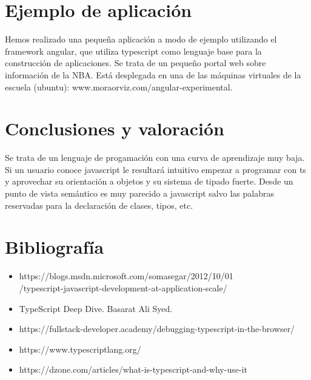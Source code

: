 \documentclass[12pt,twoside,a4paper, spanish]{article}
\begin{document}
    \section{Ejemplo de aplicación}
    
    Hemos realizado una pequeña aplicación a modo de ejemplo utilizando el framework angular, que utiliza typescript como lenguaje base para la construcción de aplicaciones. Se trata de un pequeño portal web sobre información de la NBA. Está desplegada en una de las máquinas virtuales de la escuela (ubuntu): www.moraorviz.com/angular-experimental.
    
    \section{Conclusiones y valoración}
    
    Se trata de un lenguaje de progamación con una curva de aprendizaje muy baja. Si un usuario conoce javascript le resultará intuitivo empezar a programar con ts y aprovechar su orientación a objetos y su sistema de tipado fuerte. Desde un punto de vista semántico es muy parecido a javascript salvo las palabras reservadas para la declaración de clases, tipos, etc. \\
    
    \section{Bibliografía}
    \begin{itemize}  
    	\item https://blogs.msdn.microsoft.com/somasegar/2012/10/01 \\ /typescript-javascript-development-at-application-scale/
    	\item TypeScript Deep Dive. Basarat Ali Syed. 
    	\item https://fullstack-developer.academy/debugging-typescript-in-the-browser/
    	\item https://www.typescriptlang.org/
    	\item https://dzone.com/articles/what-is-typescript-and-why-use-it
    \end{itemize}

	
\end{document}
